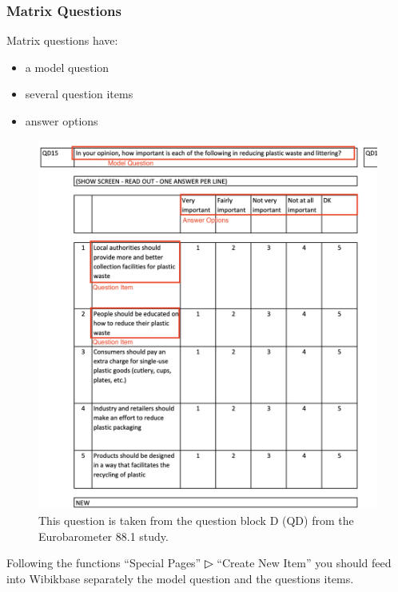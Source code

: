 \documentclass[
  letterpaper,
  DIV=11,
  numbers=noendperiod]{scrreprt}
\begin{document}
\subsubsection{Matrix Questions}\label{matrix-questions}

Matrix questions have:

\begin{itemize}
\item
  a model question
\item
  several question items
\item
  answer options
\end{itemize}

\begin{figure}[H]

{\centering \includegraphics{png/question_to_wikibase/matrix_question.png}

}

\caption{This question is taken from the question block D (QD) from the
Eurobarometer 88.1 study.}

\end{figure}%

Following the functions ``Special Pages'' ▷ ``Create New Item'' you
should feed into Wibikbase separately the model question and the
questions items.
\end{document}
